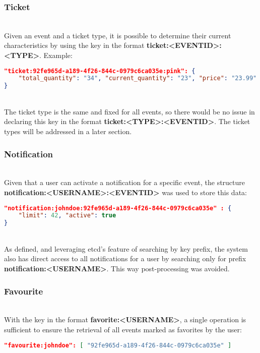 \documentclass[screen,review]{acmart}
\begin{document}
\subsubsection{Ticket}~\\
Given an event and a ticket type, it is possible to determine their current characteristics by using the key in the format \textbf{ticket:<EVENTID>:<TYPE>}. Example:

\begin{lstlisting}[language=json]
"ticket:92fe965d-a189-4f26-844c-0979c6ca035e:pink": {
    "total_quantity": "34", "current_quantity": "23", "price": "23.99"
}
\end{lstlisting}\\

The ticket type is the same and fixed for all events, so there would be no issue in declaring this key in the format \textbf{ticket:<TYPE>:<EVENTID>}. The ticket types will be addressed in a later section. \\

\subsubsection{Notification}~\\
Given that a user can activate a notification for a specific event, the structure \textbf{notification:<USERNAME>:<EVENTID>} was used to store this data:

\begin{lstlisting}[language=json]
"notification:johndoe:92fe965d-a189-4f26-844c-0979c6ca035e" : {
    "limit": 42, "active": true
}
\end{lstlisting}\\

As defined, and leveraging etcd's feature of searching by key prefix, the system also has direct access to all notifications for a user by searching only for prefix \textbf{notification:<USERNAME>}. This way post-processing was avoided. \\

\subsubsection{Favourite}~\\
With the key in the format \textbf{favorite:<USERNAME>}, a single operation is sufficient to ensure the retrieval of all events marked as favorites by the user:

\begin{lstlisting}[language=json]
"favourite:johndoe": [ "92fe965d-a189-4f26-844c-0979c6ca035e" ]
\end{lstlisting}\\
\end{document}
